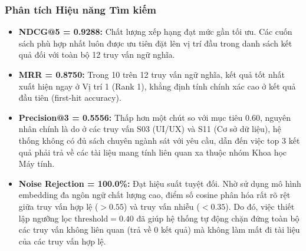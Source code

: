 \subsubsection{Phân tích Hiệu năng Tìm kiếm}

\begin{itemize}
    \item \textbf{NDCG@5 = 0.9288:} Chất lượng xếp hạng đạt mức gần tối ưu. Các cuốn sách phù hợp nhất luôn được ưu tiên đặt lên vị trí đầu trong danh sách kết quả đối với toàn bộ 12 truy vấn ngữ nghĩa.
    \item \textbf{MRR = 0.8750:} Trong 10 trên 12 truy vấn ngữ nghĩa, kết quả tốt nhất xuất hiện ngay ở Vị trí 1 (Rank 1), khẳng định tính chính xác cao ở kết quả đầu tiên (first-hit accuracy).
    \item \textbf{Precision@3 = 0.5556:} Thấp hơn một chút so với mục tiêu 0.60, nguyên nhân chính là do ở các truy vấn S03 (UI/UX) và S11 (Cơ sở dữ liệu), hệ thống không có đủ sách chuyên ngành sát với yêu cầu, dẫn đến việc top 3 kết quả phải trả về các tài liệu mang tính liên quan xa thuộc nhóm Khoa học Máy tính.
    \item \textbf{Noise Rejection = 100.0\%:} Đạt hiệu suất tuyệt đối. Nhờ sử dụng mô hình embedding đa ngôn ngữ chất lượng cao, điểm số cosine phân hóa rất rõ rệt giữa truy vấn hợp lệ ($> 0.55$) và truy vấn nhiễu ($< 0.35$). Do đó, việc thiết lập ngưỡng lọc $\text{threshold} = 0.40$ đã giúp hệ thống tự động chặn đứng toàn bộ các truy vấn không liên quan (trả về 0 kết quả) mà không làm mất đi tài liệu của các truy vấn hợp lệ.
\end{itemize}

